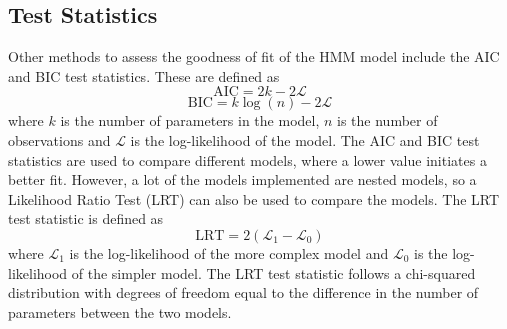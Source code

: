 \subsection{Test Statistics}
Other methods to assess the goodness of fit of the HMM model 
include the AIC \citep{wiki:aic} and BIC \citep{wiki:bic} test statistics. These are defined as
\begin{equation}
    \text{AIC} = 2k - 2\mathcal{L}
    \label{eq:aic}
\end{equation}
\begin{equation}
    \text{BIC} = k \log(n) - 2\mathcal{L}
    \label{eq:bic}
\end{equation}
where $k$ is the number of parameters in the model, $n$ is the number of observations and $\mathcal{L}$ is the log-likelihood of the model. \newline
The AIC and BIC test statistics are used to compare different models,
where a lower value initiates a better fit. \newline
However, a lot of the models implemented are nested models, so a Likelihood Ratio Test (LRT) \citep{wiki:lrt} can also be
used to compare the models. The LRT test statistic is defined as
\begin{equation}
    \text{LRT} = 2(\mathcal{L}_1 - \mathcal{L}_0)
    \label{eq:lrt}
\end{equation}
where $\mathcal{L}_1$ is the log-likelihood of the more complex
model and $\mathcal{L}_0$ is the log-likelihood of the simpler model. \newline
The LRT test statistic follows a chi-squared distribution with degrees of freedom equal 
to the difference in the number of parameters between the two models. \newline




